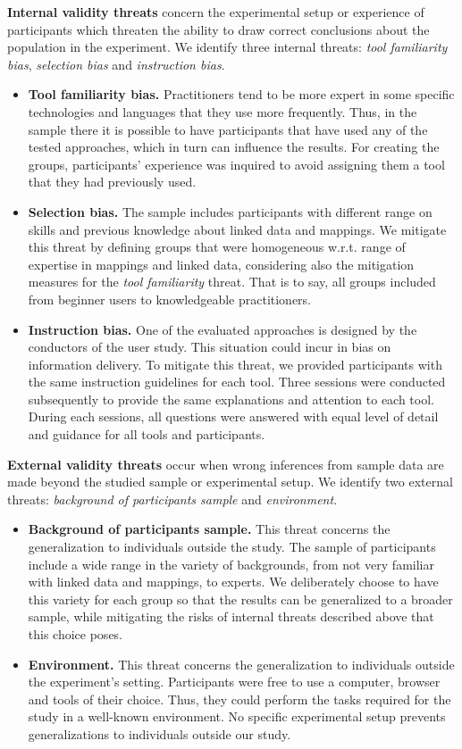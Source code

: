 \textbf{Internal validity threats} concern the experimental setup or experience of participants which threaten the ability to draw correct conclusions about the population in the experiment. We identify three internal threats: \textit{tool familiarity bias}, \textit{selection bias} and \textit{instruction bias}.
\begin{itemize}
    \item \textbf{Tool familiarity bias.} Practitioners tend to be more expert in some specific technologies and languages that they use more frequently. Thus, in the sample there it is possible to have participants that have used any of the tested approaches, which in turn can influence the results. For creating the groups, participants' experience was inquired to avoid assigning them a tool that they had previously used.
    \item \textbf{Selection bias.} The sample includes participants with different range on skills and previous knowledge about linked data and mappings. We mitigate this threat by defining groups that were  homogeneous w.r.t. range of expertise in mappings and linked data, considering also the mitigation measures for the \textit{tool familiarity} threat. That is to say, all groups included from beginner users to knowledgeable practitioners. 
    \item \textbf{Instruction bias.} One of the evaluated approaches is designed by the conductors of the user study. This situation could incur in bias on information delivery. To mitigate this threat, we provided participants with the same instruction guidelines for each tool. Three sessions were conducted subsequently to provide the same explanations and attention to each tool. During each sessions, all questions were answered with equal level of detail and guidance for all tools and participants.
\end{itemize}

\textbf{External validity threats} occur when wrong inferences from sample data are made beyond the studied sample or experimental setup. We identify two external threats: \textit{background of participants sample} and \textit{environment}.
\begin{itemize}
    \item \textbf{Background of participants sample.} This threat concerns the generalization to individuals outside the study. The sample of participants include a wide range in the variety of backgrounds, from not very familiar with linked data and mappings, to experts. We deliberately choose to have this variety for each group so that the results can be generalized to a broader sample, while mitigating the risks of internal threats described above that this choice poses. 
    \item \textbf{Environment.} This threat concerns the generalization to individuals outside the experiment’s setting. Participants were free to use a computer, browser and tools of their choice. Thus, they could perform the tasks required for the study in a well-known environment. No specific experimental setup prevents generalizations to individuals outside our study.
\end{itemize}




